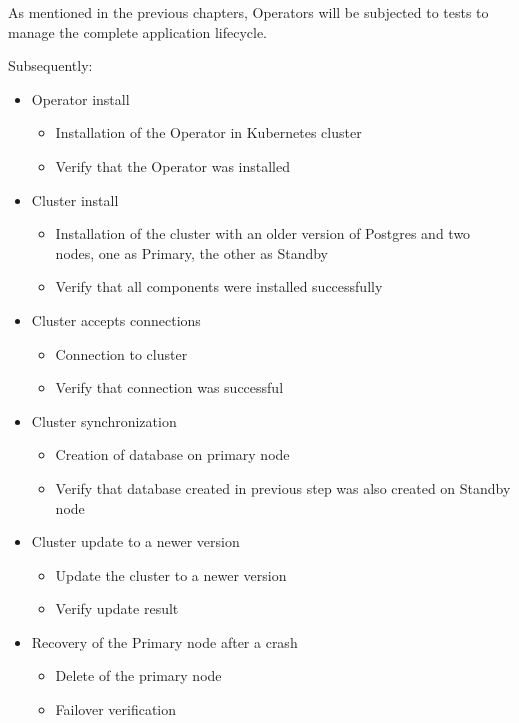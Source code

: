 As mentioned in the previous chapters, Operators will be subjected to tests to manage the complete application lifecycle.

Subsequently:
\begin{itemize}
  \item Operator install
        \begin{itemize}
          \item Installation of the Operator in Kubernetes cluster
          \item Verify that the Operator was installed
        \end{itemize}
  \item Cluster install
        \begin{itemize}
          \item Installation of the cluster with an older version of Postgres and two nodes, one as Primary, the other as Standby
          \item Verify that all components were installed successfully
        \end{itemize}
  \item Cluster accepts connections
        \begin{itemize}
          \item Connection to cluster
          \item Verify that connection was successful
        \end{itemize}
  \item Cluster synchronization
        \begin{itemize}
          \item Creation of database on primary node
          \item Verify that database created in previous step was also created on Standby node
        \end{itemize}
  \item Cluster update to a newer version
        \begin{itemize}
          \item Update the cluster to a newer version
          \item Verify update result
        \end{itemize}
  \item Recovery of the Primary node after a crash
        \begin{itemize}
          \item Delete of the primary node
          \item Failover verification

\end{itemize}
\end{itemize}
